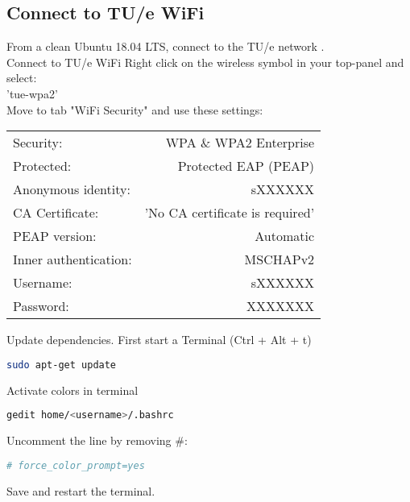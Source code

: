 \subsection{Connect to TU/e WiFi}
From a clean Ubuntu 18.04 LTS, connect to the TU/e network \cite{Connecting2Network}.\\
\newline
Connect to TU/e WiFi
Right click on the wireless symbol in your top-panel and select:\\
'tue-wpa2'\\
\newline
Move to tab "WiFi Security" and use these settings:
\begin{table}[H]
	\centering
	\begin{tabular}{l r}
		Security: &		WPA \& WPA2 Enterprise\\
		Protected: & 		Protected EAP (PEAP)\\
		Anonymous identity: & 	sXXXXXX\\
		CA Certificate: & 	'No CA certificate is required'\\
		PEAP version: & 		Automatic\\
		Inner authentication: & 	MSCHAPv2\\
		Username: & 		sXXXXXX\\
		Password: & 		XXXXXXX\\
	\end{tabular}
\end{table}
Update dependencies. First start a Terminal (Ctrl + Alt + t)
\begin{lstlisting}[language=sh]
sudo apt-get update
\end{lstlisting}
Activate colors in terminal
\begin{lstlisting}[language=sh]
gedit home/<username>/.bashrc
\end{lstlisting}
Uncomment the line by removing \#:
\begin{lstlisting}[language=sh]
# force_color_prompt=yes
\end{lstlisting}
Save and restart the terminal.
